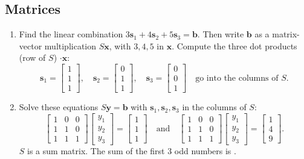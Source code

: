 \documentclass[14pt, a4paper]{article}
\begin{document}
\subsection{Matrices}
\begin{enumerate}
    \item Find the linear combination $3\boldsymbol{s}_1 + 4\boldsymbol{s}_2 + 5\boldsymbol{s}_3 = \boldsymbol{b}$. Then write $\boldsymbol{b}$ as a matrix-vector multiplication $S\boldsymbol{x}$, with $3,4,5$ in $\boldsymbol{x}$. Compute the three dot products (row of $S$) $\cdot \boldsymbol{x}$:
          \[
              \boldsymbol{s}_1 = \begin{bmatrix} 1 \\ 1 \\ 1 \end{bmatrix}, \quad
              \boldsymbol{s}_2 = \begin{bmatrix} 0 \\ 1 \\ 1 \end{bmatrix}, \quad
              \boldsymbol{s}_3 = \begin{bmatrix} 0 \\ 0 \\ 1 \end{bmatrix}
              \quad \text{go into the columns of } S.
          \]

    \item Solve these equations $S\boldsymbol{y} = \boldsymbol{b}$ with $\boldsymbol{s}_1, \boldsymbol{s}_2, \boldsymbol{s}_3$ in the columns of $S$:
          \[
              \begin{bmatrix}
                  1 & 0 & 0 \\
                  1 & 1 & 0 \\
                  1 & 1 & 1
              \end{bmatrix}
              \begin{bmatrix} y_1 \\ y_2 \\ y_3 \end{bmatrix}
              =
              \begin{bmatrix} 1 \\ 1 \\ 1 \end{bmatrix}
              \quad \text{and} \quad
              \begin{bmatrix}
                  1 & 0 & 0 \\
                  1 & 1 & 0 \\
                  1 & 1 & 1
              \end{bmatrix}
              \begin{bmatrix} y_1 \\ y_2 \\ y_3 \end{bmatrix}
              =
              \begin{bmatrix} 1 \\ 4 \\ 9 \end{bmatrix}.
          \]
          $S$ is a sum matrix. The sum of the first 3 odd numbers is \underline{\hspace{2cm}}.


\end{enumerate}
\end{document}
